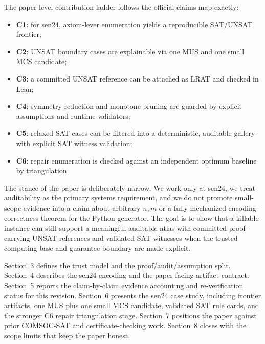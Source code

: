 The paper-level contribution ladder follows the official claims map exactly:
\begin{itemize}[leftmargin=*]
  \item \textbf{C1}: for sen24, axiom-lever enumeration yields a reproducible SAT/UNSAT frontier;
  \item \textbf{C2}: UNSAT boundary cases are explainable via one MUS and one small MCS candidate;
  \item \textbf{C3}: a committed UNSAT reference can be attached as LRAT and checked in Lean;
  \item \textbf{C4}: symmetry reduction and monotone pruning are guarded by explicit assumptions and runtime validators;
  \item \textbf{C5}: relaxed SAT cases can be filtered into a deterministic, auditable gallery with explicit SAT witness validation;
  \item \textbf{C6}: repair enumeration is checked against an independent optimum baseline by triangulation.
\end{itemize}

The stance of the paper is deliberately narrow.
We work only at sen24, we treat auditability as the primary systems requirement, and we do not promote small-scope evidence into a claim about arbitrary $n,m$ or a fully mechanized encoding-correctness theorem for the Python generator.
The goal is to show that a killable instance can still support a meaningful auditable atlas with committed proof-carrying UNSAT references and validated SAT witnesses when the trusted computing base and guarantee boundary are made explicit.

Section~3 defines the trust model and the proof/audit/assumption split.
Section~4 describes the sen24 encoding and the paper-facing artifact contract.
Section~5 reports the claim-by-claim evidence accounting and re-verification status for this revision.
Section~6 presents the sen24 case study, including frontier artifacts, one MUS plus one small MCS candidate, validated SAT rule cards, and the stronger C6 repair triangulation stage.
Section~7 positions the paper against prior COMSOC-SAT and certificate-checking work.
Section~8 closes with the scope limits that keep the paper honest.
